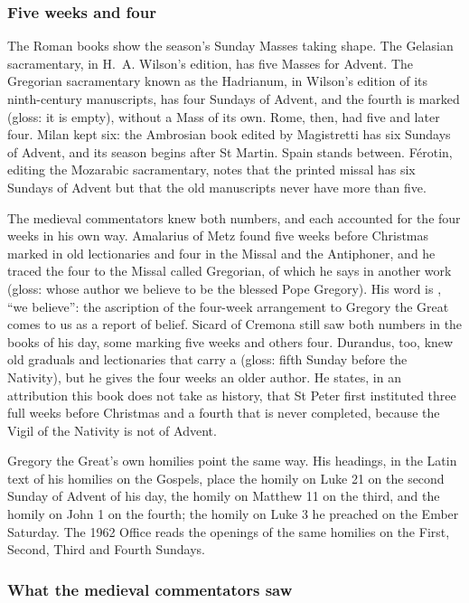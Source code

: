 \subsubsection{Five weeks and four}

The Roman books show the season's Sunday Masses taking shape. The Gelasian sacramentary, in
H.~A. Wilson's edition, has five Masses for Advent. The Gregorian sacramentary known as the
Hadrianum, in Wilson's edition of its ninth-century manuscripts, has four Sundays of Advent, and
the fourth is marked  (gloss: it is empty), without a Mass of its own. Rome, then,
had five and later four. Milan kept six: the Ambrosian book edited by Magistretti has six Sundays
of Advent, and its season begins after St Martin. Spain stands between. Férotin, editing the
Mozarabic sacramentary, notes that the printed missal has six Sundays of Advent but that the old
manuscripts never have more than five.

The medieval commentators knew both numbers, and each accounted for the four weeks in his own
way. Amalarius of Metz found five weeks before Christmas marked in old lectionaries and four in
the Missal and the Antiphoner, and he traced the four to the Missal called Gregorian, of which he
says in another work  (gloss: whose
author we believe to be the blessed Pope Gregory). His word is , ``we believe'':
the ascription of the four-week arrangement to Gregory the Great comes to us as a report of
belief. Sicard of Cremona still saw both numbers in the books of his day, some marking five weeks
and others four. Durandus, too, knew old graduals and lectionaries that carry a  (gloss: fifth Sunday before the Nativity), but he gives the four weeks
an older author. He states, in an attribution this book does not take as history, that St Peter
first instituted three full weeks before Christmas and a fourth that is never completed, because
the Vigil of the Nativity is not of Advent.

Gregory the Great's own homilies point the same way. His headings, in the Latin text of his
homilies on the Gospels, place the homily on Luke 21 on the second Sunday of Advent of his day,
the homily on Matthew 11 on the third, and the homily on John 1 on the fourth; the homily on
Luke 3 he preached on the Ember Saturday. The 1962 Office reads the openings of the same homilies
on the First, Second, Third and Fourth Sundays.

\subsubsection{What the medieval commentators saw}


